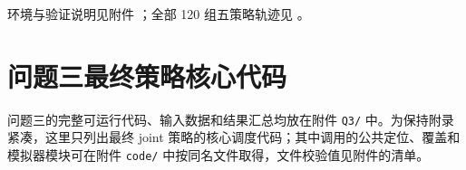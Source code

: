 环境与验证说明见附件 ；全部 120 组五策略轨迹见 。

\clearpage
\section{问题三最终策略核心代码}\label{app:q3code}
问题三的完整可运行代码、输入数据和结果汇总均放在附件
\texttt{Q3/} 中。为保持附录紧凑，这里只列出最终
\textrm{joint} 策略的核心调度代码；其中调用的公共定位、覆盖和模拟器模块可在附件
\texttt{code/} 中按同名文件取得，文件校验值见附件的清单。

